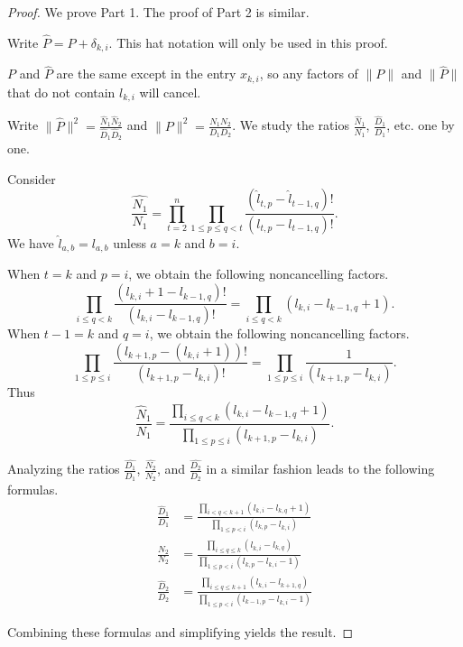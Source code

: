 \documentclass[10pt,a4paper]{amsart}
\begin{document}
\begin{proof}
  We prove Part 1. The proof of Part 2 is similar.

  Write $\hat{P}=P+\delta_{k,i}$. This hat notation will only be used
  in this proof.  
  
$P$ and $\hat{P}$ are the same except in the entry $x_{k,i}$,
so any factors of $\| P\|$ and $\| \hat{P} \|$
that do not contain $l_{k,i}$ will cancel.

Write $\|\hat{P}\|^2 = \frac{\hat{N}_1 \hat{N}_2}{\hat{D}_1 \hat{D}_2}$ and $\|P \|^2 = \frac{N_1 N_2}{D_1 D_2}$. We study the ratios $\frac{\hat{N}_1}{N_1}$, $\frac{\hat{D}_1}{D_1} $, etc. one by one.

Consider
\[
\frac{\hat{N_1}}{N_1} = \prod_{t=2}^{n} \prod_{1 \leq p \leq q < t} \frac{(\hat{l}_{t,p}-\hat{l}_{t-1,q})!}{(l_{t,p}-l_{t-1,q})!}.
\]
We have $\hat{l}_{a,b} = l_{a,b}$ unless $a=k$ and $b=i$. 

When $t=k$ and $p=i$, we obtain the following noncancelling factors.
\[
  \prod_{i \leq q < k} \frac{(l_{k,i}+1-l_{k-1,q})!}{(l_{k,i}-l_{k-1,q})!} = \prod_{i \leq q < k} (l_{k,i}-l_{k-1,q}+1).
\] 
When $t-1=k$ and $q=i$, we obtain the following noncancelling factors.
\[
  \prod_{1 \leq p \leq i} \frac{(l_{k+1,p}-(l_{k,i}+1))!}{(l_{k+1,p}-l_{k,i})!} = \prod_{1 \leq p \leq i}  \frac{1}{(l_{k+1,p}-l_{k,i})}.
\] 
Thus
\[
\frac{\hat{N}_1}{N_1} = \frac{\prod_{i \leq q < k} (l_{k,i}-l_{k-1,q}+1)}{\prod_{1 \leq p \leq i} (l_{k+1,p}-l_{k,i})}.
\]


Analyzing the ratios $\frac{\hat{D_1}}{D_1} $, $\frac{\hat{N_2}}{N_2} $, and $\frac{\hat{D_2}}{D_2} $ in a similar fashion leads to the following formulas.
\begin{align*}
\frac{\hat{D}_1}{D_1} &= \frac{\prod_{i < q < k+1} (l_{k,i}-l_{k,q}+1)}{\prod_{1 \leq p < i}  (l_{k,p}-l_{k,i})}\\
\frac{\hat{N}_2}{N_2} &= \frac{\prod_{i \leq q \leq k} (l_{k,i}-l_{k,q})}{\prod_{1 \leq p <i}  (l_{k,p}-l_{k,i}-1)}\\
  \frac{\hat{D}_2}{D_2} &= \frac{\prod_{i \leq q \leq k+1} (l_{k,i}-l_{k+1,q})}{\prod_{1 \leq p < i} (l_{k-1,p}-l_{k,i}-1)}
\end{align*}


Combining these formulas and simplifying yields the result.
\end{proof}
\end{document}
